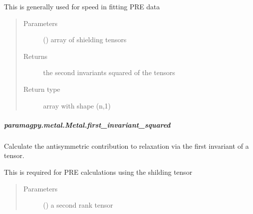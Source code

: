 \documentclass[a4paper,10pt,english,openany,oneside]{sphinxmanual}
\begin{document}
\begin{fulllineitems}
\begin{fulllineitems}
\begin{fulllineitems}
This is generally used for speed in fitting PRE data
\begin{quote}\begin{description}
\item[{Parameters}] \leavevmode
{} (\sphinxstyleliteralemphasis{\sphinxupquote{ (}}\sphinxstyleliteralemphasis{\sphinxupquote{,}}\sphinxstyleliteralemphasis{\sphinxupquote{,}}\sphinxstyleliteralemphasis{\sphinxupquote{)}}) \textendash{} array of shielding tensors

\item[{Returns}] \leavevmode
{} \textendash{} the second invariants squared of the tensors

\item[{Return type}] \leavevmode
array with shape (n,1)

\end{description}\end{quote}

\end{fulllineitems}



\subparagraph{paramagpy.metal.Metal.first\_invariant\_squared}
\label{\detokenize{reference/generated/paramagpy.metal.Metal.first_invariant_squared:paramagpy-metal-metal-first-invariant-squared}}\label{\detokenize{reference/generated/paramagpy.metal.Metal.first_invariant_squared::doc}}

\begin{fulllineitems}
\label{\detokenize{reference/generated/paramagpy.metal.Metal.first_invariant_squared:paramagpy.metal.Metal.first_invariant_squared}}
Calculate the antisymmetric contribution to relaxation via the
first invariant of a tensor.

This is required for PRE calculations using the shilding tensor
\begin{quote}\begin{description}
\item[{Parameters}] \leavevmode
{} () \textendash{} a second rank tensor


\end{description}
\end{quote}
\end{fulllineitems}
\end{fulllineitems}
\end{fulllineitems}
\end{document}
